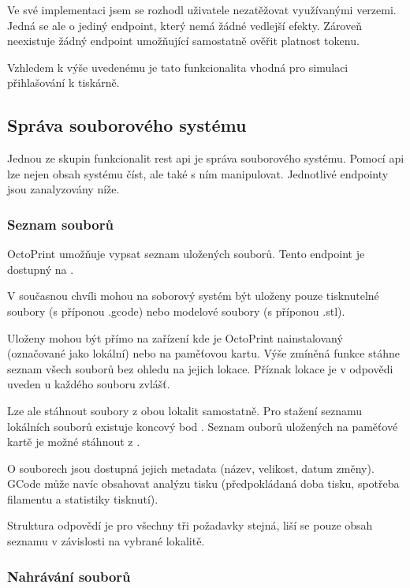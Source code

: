 Ve své implementaci jsem se rozhodl uživatele nezatěžovat využívanými verzemi.
Jedná se ale o jediný endpoint, který nemá žádné vedlejší efekty.
Zároveň neexistuje žádný endpoint umožňující samostatně ověřit platnost tokenu.

Vzhledem k výše uvedenému je tato funkcionalita vhodná pro simulaci přihlašování k tiskárně.

\subsection{Správa souborového systému}

Jednou ze skupin funkcionalit \acrshort{rest} \acrshort{api} je správa souborového systému.
Pomocí \acrshort{api} lze nejen obsah systému číst, ale také s ním manipulovat.
Jednotlivé endpointy jsou zanalyzovány níže.

\subsubsection*{Seznam souborů}

OctoPrint umožňuje vypsat seznam uložených souborů.
Tento endpoint je dostupný na .

V současnou chvíli mohou na soborový systém být uloženy pouze tisknutelné soubory (s příponou .gcode) nebo modelové soubory (s příponou .stl).

Uloženy mohou být přímo na zařízení kde je OctoPrint nainstalovaný (označované jako lokální) nebo na paměťovou kartu.
Výše zmíněná funkce stáhne seznam všech souborů bez ohledu na jejich lokace.
Příznak lokace je v odpovědi uveden u každého souboru zvlášť.

Lze ale stáhnout soubory z obou lokalit samostatně.
Pro stažení seznamu lokálních souborů existuje koncový bod .
Seznam ouborů uložených na paměťové kartě je možné stáhnout z .

O souborech jsou dostupná jejich metadata (název, velikost, datum změny).
GCode může navíc obsahovat analýzu tisku (předpokládaná doba tisku, spotřeba filamentu a statistiky tisknutí).

Struktura odpovědí je pro všechny tři požadavky stejná, liší se pouze obsah seznamu v závislosti na vybrané lokalitě.

\subsubsection*{Nahrávání souborů}

